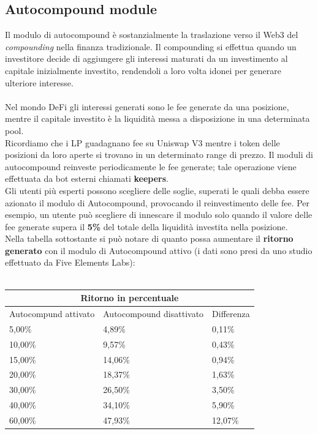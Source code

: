 \documentclass[12pt,a4paper]{report}
\begin{document}
\subsection{Autocompound module}

Il modulo di autocompound è sostanzialmente la traslazione verso il Web3 del \textit{compounding} nella finanza tradizionale. Il compounding si effettua quando un investitore decide di aggiungere gli interessi maturati da un investimento al capitale inizialmente investito, rendendoli a loro volta idonei per generare ulteriore interesse.
\\\\Nel mondo DeFi gli interessi generati sono le fee generate da una posizione, mentre il capitale investito è la liquidità messa a disposizione in una determinata pool.
\\Ricordiamo che i LP guadagnano fee su Uniswap V3 mentre i token delle posizioni da loro aperte si trovano in un determinato range di prezzo.
Il moduli di autocompound reinveste periodicamente le fee generate; tale operazione viene effettuata da bot esterni chiamati \textbf{keepers}.
\\Gli utenti più esperti possono scegliere delle soglie, superati le quali debba essere azionato il modulo di Autocompound, provocando il reinvestimento delle fee.
Per esempio, un utente può scegliere di innescare il modulo solo quando il valore delle fee generate supera il \textbf{5\%} del totale della liquidità investita nella posizione.
\\Nella tabella sottostante si può notare di quanto possa aumentare il \textbf{ritorno generato} con il modulo di Autocompound attivo (i dati sono presi da uno studio effettuato da Five Elements Labs): 
\\\\

\begin{center}
\begin{tabular}{ |p{5cm}|p{5cm}|p{2cm}| }
 \hline
 \multicolumn{3}{|c|}{Ritorno in percentuale} \\
 \hline
 Autocompund attivato& Autocompound disattivato &Differenza\\
 \hline
 5,00\%   & 4,89\%    &0,11\%  \\
 \hline
 10,00\%   & 9,57\%    &0,43\%  \\
 \hline
 15,00\%   & 14,06\%    &0,94\%  \\
 \hline
 20,00\%   & 18,37\%    &1,63\%  \\
 \hline
 30,00\%   & 26,50\%    &3,50\%  \\
 \hline
 40,00\%   & 34,10\%    &5,90\%  \\
 \hline
 60,00\%   & 47,93\%    &12,07\%  \\
 \hline
\end{tabular}
\end{center}
\\\\
\end{document}
